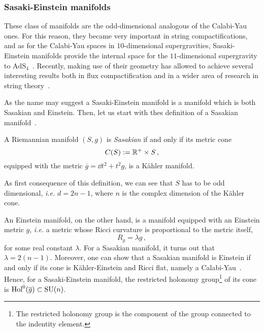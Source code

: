 \documentclass[debug]{phd}
\begin{document}
				\subsubsection{Sasaki-Einstein manifolds}
					These class of manifolds are the odd-dimensional analogous of the Calabi-Yau ones.
					For this reason, they became very important in string compactifications, and as for the Calabi-Yau spaces in $10$-dimensional supergravities, Sasaki-Einstein manifolds provide the internal space for the $11$-dimensional supergravity to $\mathrm{AdS}_4$~\cite{duffKK}. 
					Recently, making use of their geometry has allowed to achieve several interesting results both in flux compactification and in a wider area of research in string theory~\cite{DavideTriSas, DavideSas1, SE1, SE2, SE3, SE4, SE5}.
					
					As the name may suggest a Sasaki-Einstein manifold is a manifold which is both Sasakian and Einstein.
					Then, let us start with thes definition of a Sasakian manifold~\cite{SparksSE}.

					A Riemannian manifold $(S,g)$ is \emph{Sasakian} if and only if its metric cone
											\begin{equation*}
												C(S) := \mathbb{R}^+ \times S \, ,
											\end{equation*}
					equipped with the metric $\overline{g} = \dd t^2 + t^2 g$, is a K\"ahler manifold.
					
					As first consequence of this definition, we can see that $S$ has to be odd dimensional, \emph{i.e.} $d=2n-1$, where $n$ is the complex dimension of the K\"ahler cone.
					
					An Einstein manifold, on the other hand, is a manifold equipped with an Einstein metric $g$, \emph{i.e.} a metric whose Ricci curvature is proportional to the metric itself,
							\begin{equation*}
								R_g = \lambda g \, , 
							\end{equation*}
					for some real constant $\lambda$.
					For a Sasakian manifold, it turns out that $\lambda = 2(n-1)$. Moreover, one can show that a Sasakian manifold is Einstein if and only if its cone is K\"ahler-Einstein and Ricci flat, namely a Calabi-Yau~\cite{SparksSE}.
					Hence, for a Sasaki-Einstein manifold, the restricted holonomy group\footnote{%
						The restricted holonomy group is the component of the group connected to the indentity element.%
						}
					of its cone is $\mathrm{Hol}^0 (\overline{g}) \subset \mathrm{SU}(n)$.
					
\end{document}
